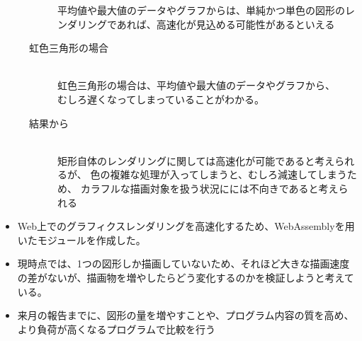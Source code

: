 \begin{description}
\begin{description}
		平均値や最大値のデータやグラフからは、単純かつ単色の図形のレンダリングであれば、高速化が見込める可能性があるといえる
		\item[虹色三角形の場合]~\\
		虹色三角形の場合は、平均値や最大値のデータやグラフから、\\むしろ遅くなってしまっていることがわかる。
		\item[結果から]~\\
		矩形自体のレンダリングに関しては高速化が可能であると考えられるが、
		色の複雑な処理が入ってしまうと、むしろ減速してしまうため、
		カラフルな描画対象を扱う状況にには不向きであると考えられる
	\end{description}

	
\end{description}


\newpage

\label{MUSUBI}
\begin{itemize}
	\item Web上でのグラフィクスレンダリングを高速化するため、WebAssemblyを用いたモジュールを作成した。
	\item 現時点では、1つの図形しか描画していないため、それほど大きな描画速度の差がないが、描画物を増やしたらどう変化するのかを検証しようと考えている。
	\item 来月の報告までに、図形の量を増やすことや、プログラム内容の質を高め、より負荷が高くなるプログラムで比較を行う
\end{itemize}
\newpage

